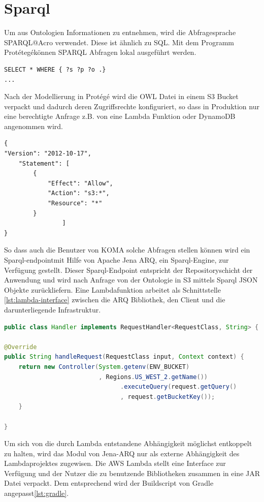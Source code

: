 \documentclass[
12pt,
english,
ngerman,
headsepline,
twoside,
openright,
numbers=noenddot,version=first
]{scrreprt}
\begin{document}
\section{Sparql}

Um aus Ontologien Informationen zu entnehmen, wird die Abfragesprache \glqq SPARQL\grqq @Acro verwendet. 
Diese ist ähnlich zu SQL. Mit dem Programm \glqq Protétegé\grqq können SPARQL Abfragen lokal ausgeführt werden.

\begin{lstlisting}[language=Sparql]
SELECT * WHERE { ?s ?p ?o .}
...
\end{lstlisting}

Nach der Modellierung in Protégé wird die OWL Datei in einem S3 Bucket verpackt und dadurch deren Zugriffsrechte konfiguriert, so dass in Produktion nur eine berechtigte Anfrage z.B. von eine Lambda Funktion oder DynamoDB angenommen wird. 

\begin{lstlisting}
{
"Version": "2012-10-17",
	"Statement": [
		{
			"Effect": "Allow",
			"Action": "s3:*",
			"Resource": "*"
		}
				]
}
\end{lstlisting}

So dass auch die Benutzer von KOMA solche Abfragen stellen können wird ein \glqq Sparql-endpoint\grqq mit Hilfe von Apache Jena ARQ, ein Sparql-Engine, zur Verfügung gestellt. 
Dieser Sparql-Endpoint entspricht der Repositoryschicht der Anwendung und wird nach Anfrage von der Ontologie in S3 mittels Sparql JSON Objekte zurückliefern.
Eine Lambdafunktion arbeitet als Schnittstelle \ref{lst:lambda-interface} zwischen die ARQ Bibliothek, den Client und die darunterliegende Infrastruktur.

\begin{lstlisting}[language=Java,caption={Schnittstele Lambda},label={lst:lambda-interface}]
public class Handler implements RequestHandler<RequestClass, String> {

@Override
public String handleRequest(RequestClass input, Context context) {
	return new Controller(System.getenv(ENV_BUCKET)
						  , Regions.US_WEST_2.getName())
								.executeQuery(request.getQuery()
								, request.getBucketKey());
	}

}

\end{lstlisting}

Um sich von die durch Lambda entstandene Abhängigkeit möglichst entkoppelt\cite{FlowerRefactoring} zu halten, wird das Modul von Jena-ARQ nur als externe Abhängigkeit des Lambdaprojektes zugewisen.
Die AWS Lambda stellt eine Interface zur Verfügung und der Nutzer die zu benutzende Bibliotheken zusammen in eine JAR Datei verpackt. Dem entsprechend wird der Buildscript von Gradle\cite{Muschko2014} angepasst\ref{lst:gradle}. 
\end{document}

